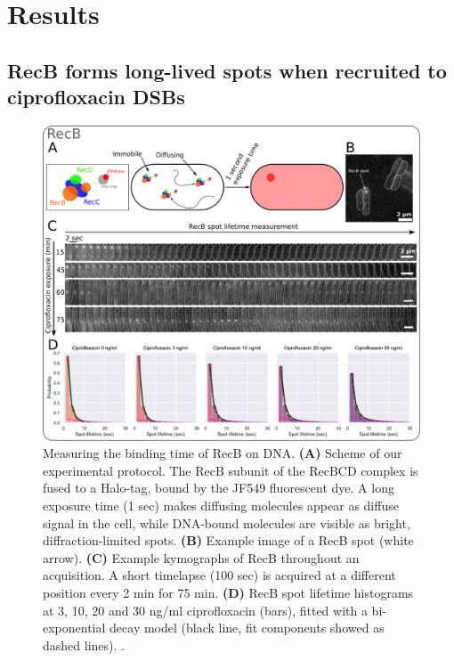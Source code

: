 \section*{Results}

\subsection*{RecB forms long-lived spots when recruited to cipro\-floxacin DSBs}

\begin{figure}[htbp]
    \centering
    \includegraphics[width=.8\textwidth]{Figures/Fig1_RecB_lifetime.pdf}
    \caption{Measuring the binding time of RecB on DNA. \textbf{(A)} Scheme of our experimental protocol. The RecB subunit of the RecBCD complex is fused to a Halo-tag, bound by the JF549 fluorescent dye\cite{Lepore2019a, Lepore2023}. A long exposure time (1 sec) makes diffusing molecules appear as diffuse signal in the cell, while DNA-bound molecules are visible as bright, diffraction-limited spots. \textbf{(B)} Example image of a RecB spot (white arrow). \textbf{(C)} Example kymographs of RecB throughout an acquisition. A short timelapse (100 sec) is acquired at a different position every 2 min for 75 min. \textbf{(D)} RecB spot lifetime histograms at 3, 10, 20 and 30 ng/ml ciprofloxacin (bars), fitted with a bi-exponential decay model (black line, fit components showed as dashed lines). . }
    \label{Fig:lifetimes}
\end{figure}

